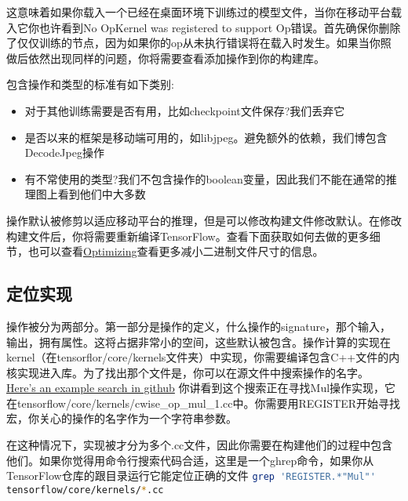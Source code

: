 这意味着如果你载入一个已经在桌面环境下训练过的模型文件，当你在移动平台载入它你也许看到No OpKernel was  registered to support Op错误。首先确保你删除了仅仅训练的节点，因为如果你的op从未执行错误将在载入时发生。如果当你照做后依然出现同样的问题，你将需要查看添加操作到你的构建库。

包含操作和类型的标准有如下类别:
\begin{itemize}
	\item 对于其他训练需要是否有用，比如checkpoint文件保存?我们丢弃它
	\item 是否以来的框架是移动端可用的，如libjpeg。避免额外的依赖，我们博包含DecodeJpeg操作
	\item 有不常使用的类型?我们不包含操作的boolean变量，因此我们不能在通常的推理图上看到他们中大多数
\end{itemize}
操作默认被修剪以适应移动平台的推理，但是可以修改构建文件修改默认。在修改构建文件后，你将需要重新编译TensorFlow。查看下面获取如何去做的更多细节，也可以查看\href{https://www.tensorflow.org/mobile/optimizing?hl=zh-cn#binary_size}{Optimizing}查看更多减小二进制文件尺寸的信息。
\subsection{定位实现}
操作被分为两部分。第一部分是操作的定义，什么操作的signature，那个输入，输出，拥有属性。这将占据非常小的空间，这些默认被包含。操作计算的实现在kernel（在tensorflor/core/kernels文件夹）中实现，你需要编译包含C++文件的内核实现进入库。为了找出那个文件是，你可以在源文件中搜索操作的名字。
\href{https://github.com/search?utf8=%E2%9C%93&q=repo%3Atensorflow%2Ftensorflow+extension%3Acc+path%3Atensorflow%2Fcore%2Fkernels+REGISTER+Mul&type=Code&ref=searchresults}{Here’s an example search in github}
你讲看到这个搜索正在寻找Mul操作实现，它在tensorflow/core/kernels/cwise\_op\_mul\_1.cc中。你需要用REGISTER开始寻找宏，你关心的操作的名字作为一个字符串参数。

在这种情况下，实现被才分为多个.cc文件，因此你需要在构建他们的过程中包含他们。如果你觉得用命令行搜索代码合适，这里是一个ghrep命令，如果你从TensorFlow仓库的跟目录运行它能定位正确的文件
\lstinline[language=Bash]{grep 'REGISTER.*"Mul"' tensorflow/core/kernels/*.cc}
